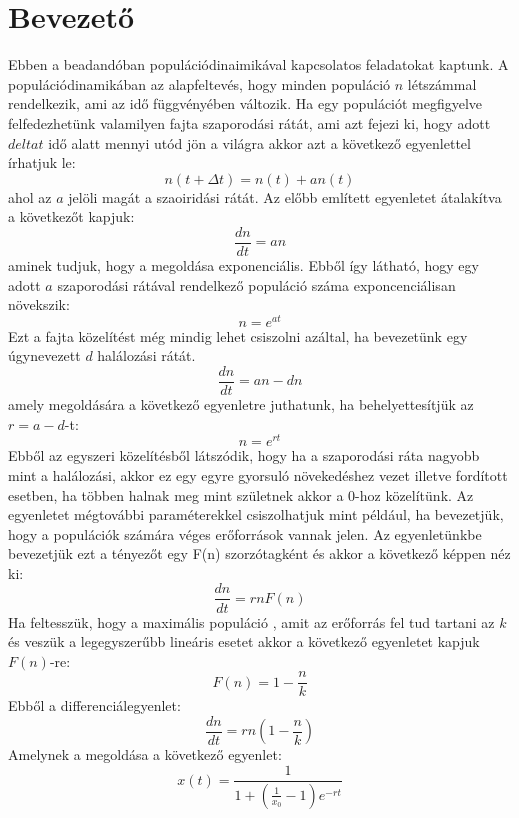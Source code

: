 \documentclass{article}[18pt]
\begin{document}
\section{Bevezető}
Ebben a beadandóban populációdinaimikával kapcsolatos feladatokat kaptunk. A populációdinamikában az alapfeltevés, hogy minden populáció $n$ létszámmal rendelkezik, ami az idő függvényében változik. Ha egy populációt megfigyelve felfedezhetünk valamilyen fajta szaporodási rátát, ami azt fejezi ki, hogy adott $delta t$ idő alatt mennyi utód jön a világra akkor azt  a következő egyenlettel írhatjuk le:
\begin{equation}
    n(t+\Delta t)=n(t)+an(t)
    \label{visibility}
\end{equation}
ahol az $a$ jelöli magát a szaoiridási rátát. Az előbb említett egyenletet átalakítva a következőt kapjuk:
\begin{equation}
    \frac{dn}{dt}=an
    \label{visibility}
\end{equation}
aminek tudjuk, hogy a megoldása exponenciális. Ebből így látható, hogy egy adott $a$ szaporodási rátával rendelkező populáció száma exponcenciálisan növekszik:
\begin{equation}
    n=e^{at}
    \label{visibility}
\end{equation}
Ezt a fajta közelítést még mindig lehet csiszolni azáltal, ha bevezetünk egy úgynevezett $d$ halálozási rátát.
\begin{equation}
    \frac{dn}{dt}=an-dn
    \label{visibility}
\end{equation}
amely megoldására a következő egyenletre juthatunk, ha behelyettesítjük az $r=a-d$-t:
\begin{equation}
    n=e^{rt}
    \label{visibility}
\end{equation}
Ebből az egyszeri közelítésből látszódik, hogy ha a szaporodási ráta nagyobb mint a halálozási, akkor ez egy egyre gyorsuló növekedéshez vezet illetve fordított esetben, ha többen halnak meg mint születnek akkor a 0-hoz közelítünk.
Az egyenletet mégtovábbi paraméterekkel csiszolhatjuk mint például, ha bevezetjük, hogy a populációk számára véges erőforrások vannak jelen. Az egyenletünkbe bevezetjük ezt a tényezőt egy F(n) szorzótagként és akkor a következő képpen néz ki:
\begin{equation}
    \frac{dn}{dt}=rnF(n)
    \label{visibility}
\end{equation}
Ha feltesszük, hogy a maximális populáció , amit az erőforrás fel tud tartani az $k$ és veszük a legegyszerűbb lineáris esetet akkor a következő egyenletet kapjuk $F(n)$-re:
\begin{equation}
    F(n)=1-\frac{n}{k}
    \label{visibility}
\end{equation}
Ebből a differenciálegyenlet:
\begin{equation}
    \frac{dn}{dt}=rn(1-\frac{n}{k})
    \label{visibility}
\end{equation}
Amelynek a megoldása a következő egyenlet:
\begin{equation}
    x(t)=\frac{1}{1+(\frac{1}{x_0}-1)e^{-rt}}
    \label{visibility}
\end{equation}
\newpage
\end{document}
